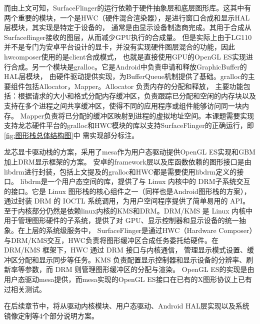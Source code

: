 而由上文可知，SurfaceFlinger的运行依赖于硬件抽象层和底层图形库。这其中有两个重要的模块，一个是HWC（硬件混合渲染器），是进行窗口合成和显示HAL层模块，其实现是特定于设备的，
通常是由显示设备制造商完成。其用于合成从Surfaceflinger接收的图层，从而减少GPU执行的合成量。
但是实际上由于LG110并不是专门为安卓平台设计的显卡，并没有实现硬件图层混合的功能，因此hwcomposer使用的是client合成模式，
也就是直接使用GPU的OpenGL ES实现进行合成。另一个模块是gralloc。它是Android中负责申请和释放GraphicBuffer的HAL层模块，
由硬件驱动提供实现，为BufferQueue机制提供了基础。gralloc的主要组件包括Allocator，Mapper。Allocator 负责内存的分配和释放，
主要功能包括：根据请求的大小和格式分配内存缓冲区，负责跟踪已分配和空闲的内存块以及支持在多个进程之间共享缓冲区，使得不同的应用程序或组件能够访问同一块内存。
Mapper负责将已分配的缓冲区映射到进程的虚拟地址空间。本课题需要实现支持龙芯硬件平台的gralloc和HWC模块的库以支持SurfaceFlinger的正确运行，即\ref{fig:图形栈总体结构图}中
需实现部分标注。

龙芯显卡驱动栈的方案，采用了mesa作为用户态驱动提供OpenGL ES实现和GBM加上DRM显示框架的方案。
安卓的framework层以及库函数依赖的图形接口是由libdrm进行封装，包括上文提及的gralloc和HWC都是需要使用libdrm定义的接口。
libdrm是一个用户态空间的库，提供了与 Linux 内核中的 DRM子系统交互的接口。它是 Linux 图形栈的核心组件之一（同样也是Android图形栈的方案），
通过封装 DRM 的 IOCTL 系统调用，为用户空间程序提供了简单易用的 API。
至于内核部分仍然是依赖linux内核的KMS和DRM。DRM/KMS 是 Linux 内核中用于管理图形硬件的子系统，提供了对 GPU、显示控制器和显示设备的统一抽象。在上层的系统级服务中，
SurfaceFlinger是通过HWC（Hardware Composer）与DRM/KMS交互，HWC负责将图形缓冲区合成任务委托给硬件。在 DRM/KMS 框架下，HWC 通过 DRM 接口与内核通信，
管理显示模式设置、缓冲区分配和显示同步等任务。KMS 负责配置显示控制器和显示设备的分辨率、刷新率等参数，而 DRM 则管理图形缓冲区的分配与渲染。
OpenGL ES的实现是由用户态驱动mesa提供，而mesa实现的OpenGL ES接口在已有的X图形协议上已有过相关测试。



在后续章节中，将从驱动内核模块、用户态驱动、Android HAL层实现以及系统镜像定制等4个部分说明方案。



